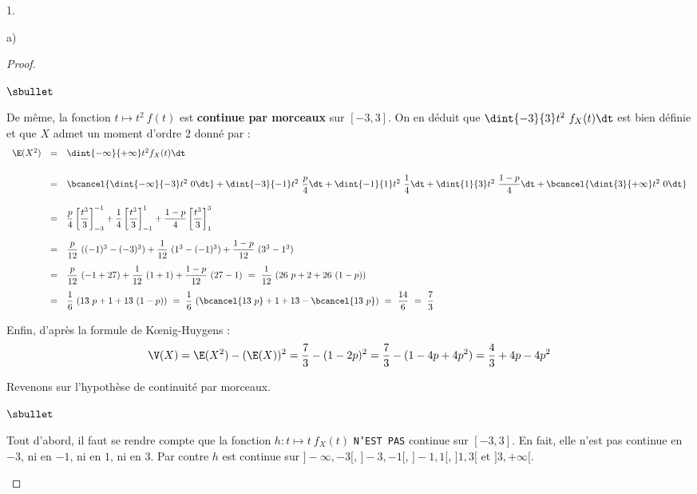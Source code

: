 \begin{noliste}{1.}
\begin{noliste}{a)}
\begin{proof}
\begin{noliste}{$\sbullet$}
      \item De même, la fonction $t \mapsto t^2 \ f(t)$ est {\bf
          continue par morceaux} sur $[-3, 3]$. On en déduit que
        $\dint{-3}{3} t^2 \ f_X(t) \dt$ est bien définie et que $X$
        admet un moment d'ordre $2$ donné par :
        \[
        \begin{array}{rcl}
          \E(X^2) 
          & = & \dint{-\infty}{+\infty} t^2 f_X(t)\dt \\[.6cm]
          & = & \bcancel{\dint{-\infty}{-3} t^2 \ 0 \dt} +
          \dint{-3}{-1}t^2\ \dfrac{p}{4}\dt +
          \dint{-1}{1}t^2\ \dfrac{1}{4}\dt + \dint{1}{3}t^2\
          \dfrac{1-p}{4}\dt + \bcancel{\dint{3}{+\infty} t^2 \ 0
            \dt} \\[.6cm]
          & = & \dfrac{p}{4}\left[ \dfrac{t^3}{3} \right]_{-3}^{-1}
          +\dfrac{1}{4}\left[ \dfrac{t^3}{3} \right]_{-1}^{1}
          +\dfrac{1-p}{4}\left[ \dfrac{t^3}{3} \right]_{1}^{3}  \\[.6cm]
          & = & \dfrac{p}{12} \ ((-1)^3 - (-3)^3) + \dfrac{1}{12} \
          (1^3 - (-1)^3) + \dfrac{1-p}{12} \ (3^3 - 1^3) \\[.4cm]
          & = & \dfrac{p}{12} \ (-1 + 27) + \dfrac{1}{12} \
          (1 + 1) + \dfrac{1-p}{12} \ (27 - 1) 
          \ = \ \dfrac{1}{12} \ (26 \ p + 2 + 26 \ (1-p))
          \\[.4cm]
          & = & \dfrac{1}{6} \ (13 \ p + 1 + 13 \ (1-p)) \ = \
          \dfrac{1}{6} \ (\bcancel{13 \ p} + 1 + 13 - \bcancel{13 \ p}) \ = \
          \dfrac{14}{6} \ = \ \dfrac{7}{3}
        \end{array}
        \]
     
      \item Enfin, d'après la formule de K\oe{}nig-Huygens :
        \[
        \V(X) = \E(X^2) - (\E(X))^2 = \dfrac{7}{3}-(1-2p)^2 =
        \dfrac{7}{3} - (1 - 4p + 4p^2) = \dfrac{4}{3} + 4p - 4p^2
        \]
      \end{noliste}
      \conc{Ainsi, $\E(X) = 1-2p$ \ et \ $\V(X) = \dfrac{4}{3} + 4p -
        4p^2$.}%


      \newpage


      \begin{remark}%
        Revenons sur l'hypothèse de continuité par morceaux.
        \begin{noliste}{$\sbullet$}
        \item Tout d'abord, il faut se rendre compte que la fonction
          $h : t \mapsto t \ f_X(t)$ {\tt N'EST PAS} continue sur
          $[-3, 3]$. En fait, elle n'est pas continue en $-3$, ni en
          $-1$, ni en $1$, ni en $3$. Par contre $h$ est continue sur
          $]-\infty, -3[$, $]-3, -1[$, $]-1, 1[$, $]1, 3[$ et $]3,
          +\infty[$.
          

\end{noliste}
\end{remark}
\end{proof}
\end{noliste}
\end{noliste}
